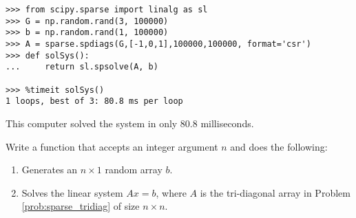 \begin{lstlisting}
>>> from scipy.sparse import linalg as sl
>>> G = np.random.rand(3, 100000)
>>> b = np.random.rand(1, 100000)
>>> A = sparse.spdiags(G,[-1,0,1],100000,100000, format='csr')
>>> def solSys():
...     return sl.spsolve(A, b)

>>> %timeit solSys()
1 loops, best of 3: 80.8 ms per loop

\end{lstlisting}

This computer solved the system in only 80.8 milliseconds.

\begin{comment}
\begin{problem}
Write a function that accepts an integer argument \li{n} as well as a keyword argument \li{sparse} whose value is either \li{True} or \li{False} (default to \li{False}). 
Then do the following:
\begin{enumerate}
\item Inside of the function, use your previous solutions to generate an $n \times n$ tri-diagonal array $A$ -- either sparse or full depending on the value of the \li{sparse} argument.
\item Generate an $n \times 1$ random array $b$
\item Solve the system $Ax = b$, using either \li{scipy.sparse.linalg.spsolve} or \li{scipy.linalg.solve}
(again depending on the value of \li{sparse}) and return the solution.
\item Time the function for \li{n = 2000} using both the sparse and the full option.
\end{enumerate}
\end{problem}
\end{comment}


\begin{problem}
Write a function that accepts an integer argument $n$ and does the following:
\begin{enumerate}
\item Generates an $n \times 1$ random array $b$.
\item Solves the linear system $Ax = b$, where $A$ is the tri-diagonal array in Problem \ref{prob:sparse_tridiag} of size $n \times n$.
\end{enumerate}
\end{problem}



